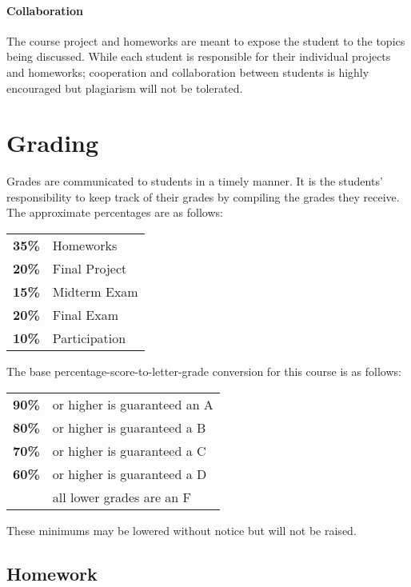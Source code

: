 \documentclass[12pt]{scrartcl}
\begin{document}
\paragraph{Collaboration} 
The course project and homeworks are meant to expose the student to the topics being discussed. 
While each student is responsible for their individual projects and homeworks; 
cooperation and collaboration between students is highly encouraged but plagiarism will not be tolerated.

\section{Grading}

Grades are communicated to students in a timely manner. 
It is the students’ responsibility to keep track of their grades by compiling the grades they receive. 
The approximate percentages are as follows:
\begin{center}
\begin{tabular}{rl}
\textbf{35\% } & Homeworks\\
\textbf{20\% } & Final Project\\
\textbf{15\% } & Midterm Exam\\
\textbf{20\% } & Final Exam \\
\textbf{10\% } & Participation\\
\end{tabular}
\end{center}

The base percentage-score-to-letter-grade conversion for this course is as follows: 
\begin{center}
\begin{tabular}{rl}
\textbf{90\%}& or higher is guaranteed an A \\
\textbf{80\%}& or higher is guaranteed a B \\
\textbf{70\%}& or higher is guaranteed a C \\
\textbf{60\%}& or higher is guaranteed a D \\
\textbf{}& all lower grades are an F 
\end{tabular}
\end{center}
These minimums may be lowered without notice but will not be raised. 


\subsection{Homework }
\end{document}
